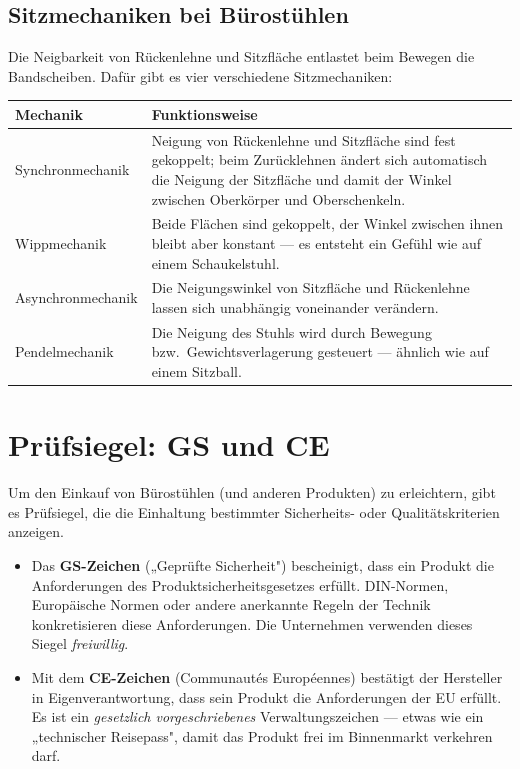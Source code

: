 \documentclass[11pt, a4paper]{article}
\begin{document}
\subsection{Sitzmechaniken bei Bürostühlen}

Die Neigbarkeit von Rückenlehne und Sitzfläche entlastet beim Bewegen die Bandscheiben.
Dafür gibt es vier verschiedene Sitzmechaniken:

\begin{center}
\begin{tabular}{p{3.2cm} p{9.2cm}}
\toprule
\textbf{Mechanik} & \textbf{Funktionsweise}\\
\midrule
Synchronmechanik & Neigung von Rückenlehne und Sitzfläche sind fest gekoppelt; beim Zurücklehnen ändert sich automatisch die Neigung der Sitzfläche und damit der Winkel zwischen Oberkörper und Oberschenkeln.\\
Wippmechanik & Beide Flächen sind gekoppelt, der Winkel zwischen ihnen bleibt aber konstant --- es entsteht ein Gefühl wie auf einem Schaukelstuhl.\\
Asynchronmechanik & Die Neigungswinkel von Sitzfläche und Rückenlehne lassen sich unabhängig voneinander verändern.\\
Pendelmechanik & Die Neigung des Stuhls wird durch Bewegung bzw.\ Gewichtsverlagerung gesteuert --- ähnlich wie auf einem Sitzball.\\
\bottomrule
\end{tabular}
\end{center}

\section{Prüfsiegel: GS und CE}

Um den Einkauf von Bürostühlen (und anderen Produkten) zu erleichtern, gibt es Prüfsiegel,
die die Einhaltung bestimmter Sicherheits- oder Qualitätskriterien anzeigen.

\begin{itemize}
  \item Das \textbf{GS-Zeichen} („Geprüfte Sicherheit") bescheinigt, dass ein Produkt die
    Anforderungen des Produktsicherheitsgesetzes erfüllt. DIN-Normen, Europäische Normen
    oder andere anerkannte Regeln der Technik konkretisieren diese Anforderungen. Die
    Unternehmen verwenden dieses Siegel \emph{freiwillig}.
  \item Mit dem \textbf{CE-Zeichen} (Communautés Européennes) bestätigt der Hersteller in
    Eigenverantwortung, dass sein Produkt die Anforderungen der EU erfüllt. Es ist ein
    \emph{gesetzlich vorgeschriebenes} Verwaltungszeichen --- etwas wie ein „technischer
    Reisepass", damit das Produkt frei im Binnenmarkt verkehren darf.
\end{itemize}
\end{document}
